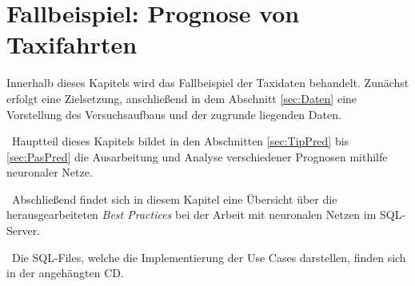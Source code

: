 \chapter{Fallbeispiel: Prognose von Taxifahrten}
\label{cha:Taxis} \label{cha:Experiment}
Innerhalb dieses Kapitels wird das Fallbeispiel der Taxidaten behandelt. Zunächst erfolgt eine Zielsetzung, anschließend in dem Abschnitt \ref{sec:Daten} eine Vorstellung des Versuchsaufbaus und der zugrunde liegenden Daten.

~\newline Hauptteil dieses Kapitels bildet in den Abschnitten \ref{sec:TipPred} bis \ref{sec:PasPred} die Ausarbeitung und Analyse verschiedener Prognosen mithilfe neuronaler Netze.

~\newline Abschließend findet sich in diesem Kapitel eine Übersicht über die herausgearbeiteten \textit{Best Practices} bei der Arbeit mit neuronalen Netzen im SQL-Server.

~\newline Die SQL-Files, welche die Implementierung der Use Cases darstellen, finden sich in der angehängten CD.




